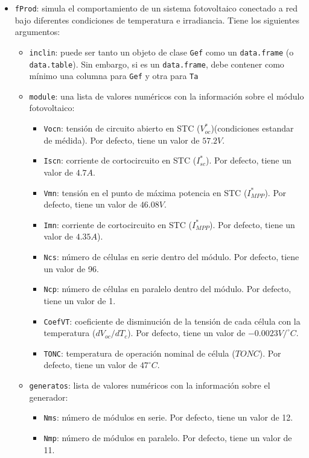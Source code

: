\begin{itemize}
\item \texttt{fProd}: simula el comportamiento de un sistema fotovoltaico conectado a red bajo diferentes condiciones de temperatura e irradiancia. Tiene los siguientes argumentos:
\begin{itemize}
\item \texttt{inclin}: puede ser tanto un objeto de clase \texttt{Gef} como un \texttt{data.frame} (o \texttt{data.table}). Sin embargo, si es un \texttt{data.frame}, debe contener como mínimo una columna para \texttt{Gef} y otra para \texttt{Ta}
\item \texttt{module}: una lista de valores numéricos con la información sobre el módulo fotovoltaico:
\begin{itemize}
\item \texttt{Vocn}: tensión de circuito abierto en STC (\(V_{oc}^*\))(condiciones estandar de médida). Por defecto, tiene un valor de \(57.2V\).
\item \texttt{Iscn}: corriente de cortocircuito en STC (\(I_{sc}^*\)). Por defecto, tiene un valor de \(4.7A\).
\item \texttt{Vmn}: tensión en el punto de máxima potencia en STC (\(I_{MPP}^*\)). Por defecto, tiene un valor de \(46.08V\).
\item \texttt{Imn}: corriente de cortocircuito en STC (\(I_{MPP}^*\)). Por defecto, tiene un valor de \(4.35A\)).
\item \texttt{Ncs}: número de células en serie dentro del módulo. Por defecto, tiene un valor de 96.
\item \texttt{Ncp}: número de células en paralelo dentro del módulo. Por defecto, tiene un valor de 1.
\item \texttt{CoefVT}: coeficiente de disminución de la tensión  de cada célula con la temperatura (\(dV_{oc}/dT_c\)). Por defecto, tiene un valor de \(-0.0023 V/^\circ C\).
\item \texttt{TONC}: temperatura de operación nominal de célula (\(TONC\)). Por defecto, tiene un valor de \(47^\circ C\).
\end{itemize}
\item \texttt{generatos}: lista de valores numéricos con la información sobre el generador:
\begin{itemize}
\item \texttt{Nms}: número de módulos en serie. Por defecto, tiene un valor de 12.
\item \texttt{Nmp}: número de módulos en paralelo. Por defecto, tiene un valor de 11.

\end{itemize}
\end{itemize}
\end{itemize}
